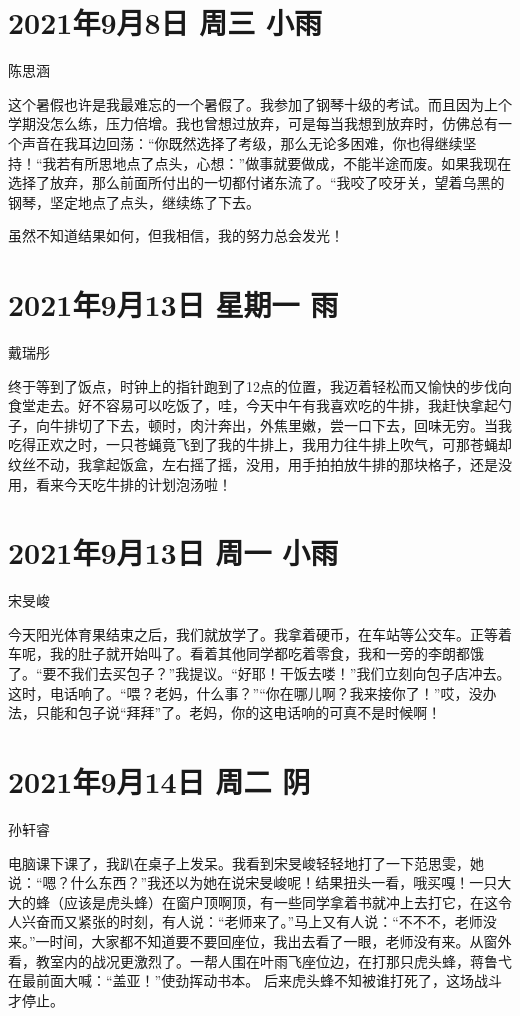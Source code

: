 \section{2021年9月8日 周三 小雨}

陈思涵

这个暑假也许是我最难忘的一个暑假了。我参加了钢琴十级的考试。而且因为上个学期没怎么练，压力倍增。我也曾想过放弃，可是每当我想到放弃时，仿佛总有一个声音在我耳边回荡：“你既然选择了考级，那么无论多困难，你也得继续坚持！“我若有所思地点了点头，心想：”做事就要做成，不能半途而废。如果我现在选择了放弃，那么前面所付出的一切都付诸东流了。“我咬了咬牙关，望着乌黑的钢琴，坚定地点了点头，继续练了下去。

虽然不知道结果如何，但我相信，我的努力总会发光！

\section{2021年9月13日 星期一 雨}

戴瑞彤

终于等到了饭点，时钟上的指针跑到了12点的位置，我迈着轻松而又愉快的步伐向食堂走去。好不容易可以吃饭了，哇，今天中午有我喜欢吃的牛排，我赶快拿起勺子，向牛排切了下去，顿时，肉汁奔出，外焦里嫩，尝一口下去，回味无穷。当我吃得正欢之时，一只苍蝇竟飞到了我的牛排上，我用力往牛排上吹气，可那苍蝇却纹丝不动，我拿起饭盒，左右摇了摇，没用，用手拍拍放牛排的那块格子，还是没用，看来今天吃牛排的计划泡汤啦！

\section{2021年9月13日 周一 小雨}

宋旻峻

今天阳光体育果结束之后，我们就放学了。我拿着硬币，在车站等公交车。正等着车呢，我的肚子就开始叫了。看着其他同学都吃着零食，我和一旁的李朗都饿了。“要不我们去买包子？”我提议。“好耶！干饭去喽！”我们立刻向包子店冲去。这时，电话响了。“喂？老妈，什么事？”“你在哪儿啊？我来接你了！”哎，没办法，只能和包子说“拜拜”了。老妈，你的这电话响的可真不是时候啊！

\section{2021年9月14日 周二 阴}

孙轩睿

电脑课下课了，我趴在桌子上发呆。我看到宋旻峻轻轻地打了一下范思雯，她说：“嗯？什么东西？”我还以为她在说宋旻峻呢！结果扭头一看，哦买嘎！一只大大的蜂（应该是虎头蜂）在窗户顶啊顶，有一些同学拿着书就冲上去打它，在这令人兴奋而又紧张的时刻，有人说：“老师来了。”马上又有人说：“不不不，老师没来。”一时间，大家都不知道要不要回座位，我出去看了一眼，老师没有来。从窗外看，教室内的战况更激烈了。一帮人围在叶雨飞座位边，在打那只虎头蜂，蒋鲁弋在最前面大喊：“盖亚！”使劲挥动书本。
后来虎头蜂不知被谁打死了，这场战斗才停止。


